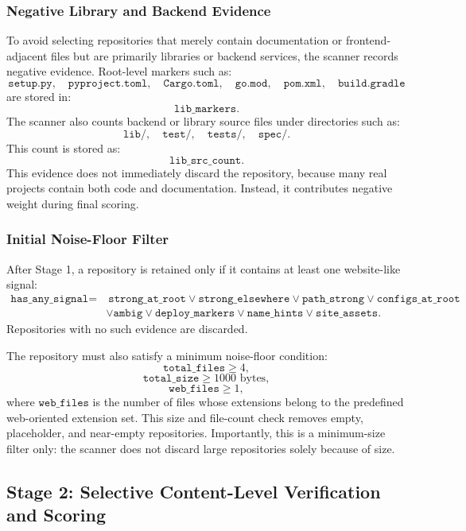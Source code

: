 \subsubsection{Negative Library and Backend Evidence}

To avoid selecting repositories that merely contain documentation or frontend-adjacent files but are primarily libraries or backend services, the scanner records negative evidence. Root-level markers such as:
\[
\texttt{setup.py},\quad \texttt{pyproject.toml},\quad \texttt{Cargo.toml},\quad
\texttt{go.mod},\quad \texttt{pom.xml},\quad \texttt{build.gradle}
\]
are stored in:
\[
\texttt{lib\_markers}.
\]
The scanner also counts backend or library source files under directories such as:
\[
\texttt{lib/},\quad \texttt{test/},\quad \texttt{tests/},\quad \texttt{spec/}.
\]
This count is stored as:
\[
\texttt{lib\_src\_count}.
\]
This evidence does not immediately discard the repository, because many real projects contain both code and documentation. Instead, it contributes negative weight during final scoring.

\subsubsection{Initial Noise-Floor Filter}

After Stage 1, a repository is retained only if it contains at least one website-like signal:
\[
\begin{aligned}
\texttt{has\_any\_signal} = 
&\ \texttt{strong\_at\_root}
\lor \texttt{strong\_elsewhere}
\lor \texttt{path\_strong}
\lor \texttt{configs\_at\_root}\\
&\lor \texttt{ambig}
\lor \texttt{deploy\_markers}
\lor \texttt{name\_hints}
\lor \texttt{site\_assets}.
\end{aligned}
\]
Repositories with no such evidence are discarded.

The repository must also satisfy a minimum noise-floor condition:
\[
\texttt{total\_files} \geq 4,
\]
\[
\texttt{total\_size} \geq 1000 \text{ bytes},
\]
\[
\texttt{web\_files} \geq 1,
\]
where \(\texttt{web\_files}\) is the number of files whose extensions belong to the predefined web-oriented extension set. This size and file-count check removes empty, placeholder, and near-empty repositories. Importantly, this is a minimum-size filter only: the scanner does not discard large repositories solely because of size.

\subsection{Stage 2: Selective Content-Level Verification and Scoring}

